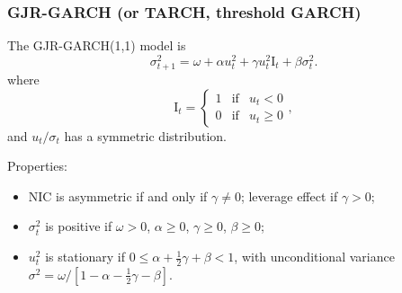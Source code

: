 \begin{frame}%

\frametitle{GJR-GARCH (or TARCH, threshold GARCH)}

The GJR-GARCH(1,1) model is%
\begin{equation*}
\sigma _{t+1}^{2}=\omega +\alpha u_{t}^{2}+\gamma u_{t}^{2}\text{I}%
_{t}+\beta \sigma _{t}^{2}.
\end{equation*}%
where%
\begin{equation*}
\text{I}_{t}=\left\{
\begin{array}{ccc}
1 & \text{if} & u_{t}<0 \\
0 & \text{if} & u_{t}\geq 0%
\end{array}%
\right. ,
\end{equation*}%
and $u_{t}/\sigma_{t}$ has a symmetric distribution.

Properties:

\begin{itemize}
\item NIC is asymmetric if and only if $\gamma \neq 0$; leverage effect if $%
\gamma >0$;

\item $\sigma _{t}^{2}$ is positive if $\omega >0$, $\alpha \geq 0$, $\gamma
\geq 0$, $\beta \geq 0$;

\item $u_{t}^{2}$ is stationary if $0\leq \alpha +\frac{1}{2}\gamma +\beta
<1 $, with unconditional variance $\sigma ^{2}=\omega /\left[ 1-\alpha -%
\frac{1}{2}\gamma -\beta \right] $.
\end{itemize}

\end{frame}%


